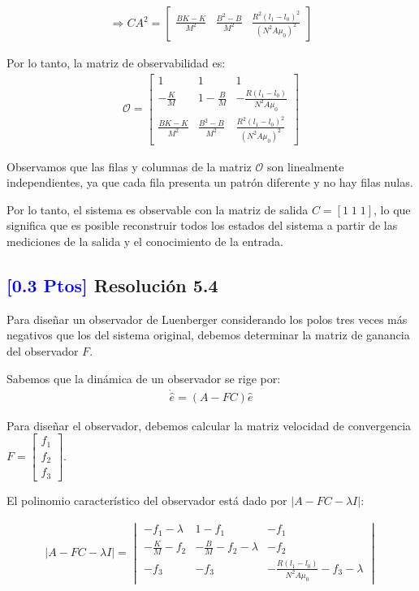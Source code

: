 \documentclass[
  11pt,
  letterpaper,
   addpoints,
   answers
  ]{exam}
\begin{document}
\begin{solution}
\begin{align}
\Rightarrow CA^2 = \begin{bmatrix}
\frac{BK-K}{M^2} & \frac{B^2-B}{M^2} & \frac{R^2(l_1-l_0)^2}{(N^2A\mu_0)^2}
\end{bmatrix}
\end{align}

Por lo tanto, la matriz de observabilidad es:
\begin{align}
\mathcal{O} = \begin{bmatrix}
1 & 1 & 1 \\
-\frac{K}{M} & 1-\frac{B}{M} & -\frac{R(l_1-l_0)}{N^2A\mu_0} \\
\frac{BK-K}{M^2} & \frac{B^2-B}{M^2} & \frac{R^2(l_1-l_0)^2}{(N^2A\mu_0)^2}
\end{bmatrix}
\end{align}

Observamos que las filas y columnas de la matriz $\mathcal{O}$ son linealmente independientes, ya que cada fila presenta un patrón diferente y no hay filas nulas.

Por lo tanto, el sistema es observable con la matriz de salida $C = [1 \; 1 \; 1]$, lo que significa que es posible reconstruir todos los estados del sistema a partir de las mediciones de la salida y el conocimiento de la entrada.

\subsection*{\textcolor{blue}{[0.3 Ptos]} Resolución 5.4}

Para diseñar un observador de Luenberger considerando los polos tres veces más negativos que los del sistema original, debemos determinar la matriz de ganancia del observador $F$.

Sabemos que la dinámica de un observador se rige por:
\begin{align}
\dot{\hat{e}} = (A - FC)\hat{e}
\end{align}

Para diseñar el observador, debemos calcular la matriz velocidad de convergencia $F = \begin{bmatrix} f_1 \\ f_2 \\ f_3 \end{bmatrix}$.

El polinomio característico del observador está dado por $|A - FC - \lambda I|$:

\begin{align}
|A - FC - \lambda I| = \begin{vmatrix}
-f_1 - \lambda & 1 - f_1 & -f_1 \\
-\frac{K}{M} - f_2 & -\frac{B}{M} - f_2 - \lambda & -f_2 \\
-f_3 & -f_3 & -\frac{R(l_1-l_0)}{N^2A\mu_0} - f_3 - \lambda
\end{vmatrix}
\end{align}


\end{solution}
\end{document}

